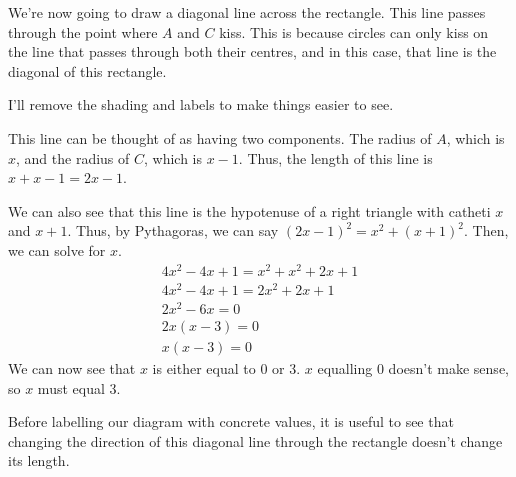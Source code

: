 \documentclass[a4paper]{article}
\begin{document}
We're now going to draw a diagonal line across the rectangle. This line passes through the point where $A$ and $C$ kiss. This is because circles can only kiss on the line that passes through both their centres, and in this case, that line is the diagonal of this rectangle.

I'll remove the shading and labels to make things easier to see.

\hspace{\fill}
\hspace{\fill}

This line can be thought of as having two components. The radius of $A$, which is $x$, and the radius of $C$, which is $x - 1$. Thus, the length of this line is $x + x - 1 = 2x - 1$.

We can also see that this line is the hypotenuse of a right triangle with catheti $x$ and $x + 1$. Thus, by Pythagoras, we can say $(2x - 1)^2 = x^2 + (x + 1)^2$. Then, we can solve for $x$.
\begin{gather*}
4x^2 - 4x + 1 = x^2 + x^2 + 2x + 1\\
4x^2 - 4x + 1 = 2x^2 + 2x + 1\\
2x^2 - 6x = 0\\
2x(x - 3) = 0\\
x(x - 3) = 0
\end{gather*}
We can now see that $x$ is either equal to 0 or 3. $x$ equalling 0 doesn't make sense, so $x$ must equal 3.

Before labelling our diagram with concrete values, it is useful to see that changing the direction of this diagonal line through the rectangle doesn't change its length.

\hspace{\fill}
\hspace{\fill}
\end{document}
